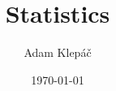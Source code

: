 \documentclass[aspectratio=169,11pt,svgnames]{beamer}
\title{Statistics}
\date{\today}
\author{Adam Klepáč}
\institute[GEVO]{Gymnázium Evolution Jižní Město}
\begin{document}
\titleframe

%
%
%
%
\end{document}
